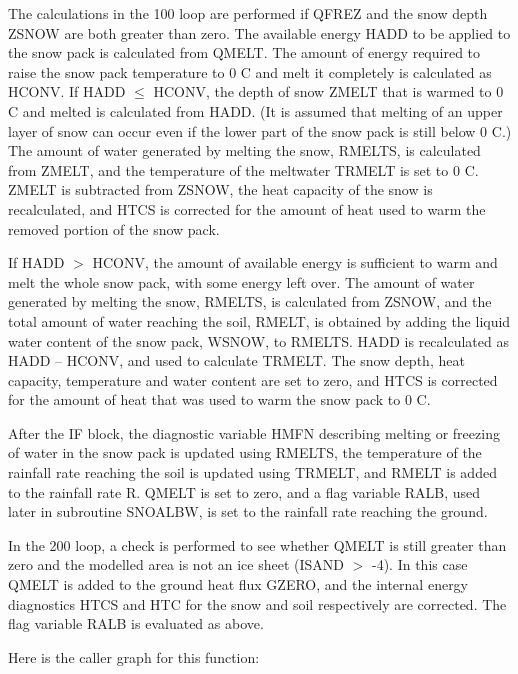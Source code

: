 The calculations in the 100 loop are performed if Q\+F\+R\+E\+Z and the snow depth Z\+S\+N\+O\+W are both greater than zero. The available energy H\+A\+D\+D to be applied to the snow pack is calculated from Q\+M\+E\+L\+T. The amount of energy required to raise the snow pack temperature to 0 C and melt it completely is calculated as H\+C\+O\+N\+V. If H\+A\+D\+D $\leq$ H\+C\+O\+N\+V, the depth of snow Z\+M\+E\+L\+T that is warmed to 0 C and melted is calculated from H\+A\+D\+D. (It is assumed that melting of an upper layer of snow can occur even if the lower part of the snow pack is still below 0 C.) The amount of water generated by melting the snow, R\+M\+E\+L\+T\+S, is calculated from Z\+M\+E\+L\+T, and the temperature of the meltwater T\+R\+M\+E\+L\+T is set to 0 C. Z\+M\+E\+L\+T is subtracted from Z\+S\+N\+O\+W, the heat capacity of the snow is recalculated, and H\+T\+C\+S is corrected for the amount of heat used to warm the removed portion of the snow pack.

If H\+A\+D\+D $>$ H\+C\+O\+N\+V, the amount of available energy is sufficient to warm and melt the whole snow pack, with some energy left over. The amount of water generated by melting the snow, R\+M\+E\+L\+T\+S, is calculated from Z\+S\+N\+O\+W, and the total amount of water reaching the soil, R\+M\+E\+L\+T, is obtained by adding the liquid water content of the snow pack, W\+S\+N\+O\+W, to R\+M\+E\+L\+T\+S. H\+A\+D\+D is recalculated as H\+A\+D\+D – H\+C\+O\+N\+V, and used to calculate T\+R\+M\+E\+L\+T. The snow depth, heat capacity, temperature and water content are set to zero, and H\+T\+C\+S is corrected for the amount of heat that was used to warm the snow pack to 0 C.

After the I\+F block, the diagnostic variable H\+M\+F\+N describing melting or freezing of water in the snow pack is updated using R\+M\+E\+L\+T\+S, the temperature of the rainfall rate reaching the soil is updated using T\+R\+M\+E\+L\+T, and R\+M\+E\+L\+T is added to the rainfall rate R. Q\+M\+E\+L\+T is set to zero, and a flag variable R\+A\+L\+B, used later in subroutine S\+N\+O\+A\+L\+B\+W, is set to the rainfall rate reaching the ground.

In the 200 loop, a check is performed to see whether Q\+M\+E\+L\+T is still greater than zero and the modelled area is not an ice sheet (I\+S\+A\+N\+D $>$ -\/4). In this case Q\+M\+E\+L\+T is added to the ground heat flux G\+Z\+E\+R\+O, and the internal energy diagnostics H\+T\+C\+S and H\+T\+C for the snow and soil respectively are corrected. The flag variable R\+A\+L\+B is evaluated as above.

Here is the caller graph for this function\+:


